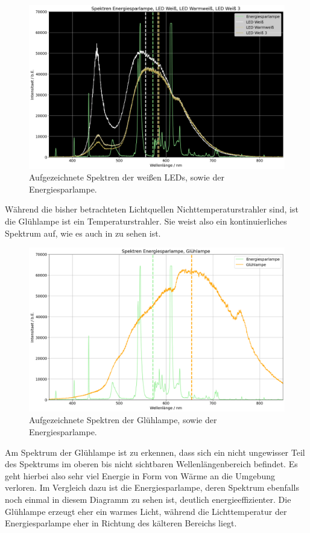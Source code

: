 \begin{figure}[H]
  \centering
  \includegraphics[width=.9\textwidth]{files/plots/led_und_energiespar.png}
  \caption{Aufgezeichnete Spektren der weißen LEDs, sowie der Energiesparlampe.}
  \label{fig:led_und_energiespar}
\end{figure}

Während die bisher betrachteten Lichtquellen Nichttemperaturstrahler sind, ist die Glühlampe ist ein Temperaturstrahler. Sie weist also ein kontinuierliches Spektrum auf, wie es auch in  zu sehen ist.

\begin{figure}[H]
  \centering
  \includegraphics[width=.9\textwidth]{files/plots/energiespar_und_glueh.png}
  \caption{Aufgezeichnete Spektren der Glühlampe, sowie der Energiesparlampe.}
  \label{fig:energiespar_und_glueh}
\end{figure}

Am Spektrum der Glühlampe ist zu erkennen, dass sich ein nicht ungewisser Teil des Spektrums im oberen bis nicht sichtbaren Wellenlängenbereich befindet. Es geht hierbei also sehr viel Energie in Form von Wärme an die Umgebung verloren. Im Vergleich dazu ist die Energiesparlampe, deren Spektrum ebenfalls noch einmal in diesem Diagramm zu sehen ist, deutlich energieeffizienter. Die Glühlampe erzeugt eher ein warmes Licht, während die Lichttemperatur der Energiesparlampe eher in Richtung des kälteren Bereichs liegt.

